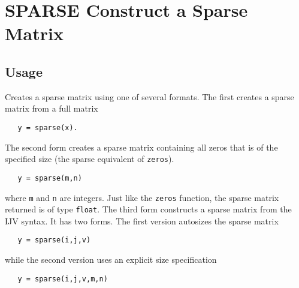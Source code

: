 \section{SPARSE Construct a Sparse Matrix}

\subsection{Usage}

Creates a sparse matrix using one of several formats.  The 
first creates a sparse matrix from a full matrix
\begin{verbatim}
   y = sparse(x).
\end{verbatim}
The second form creates a sparse matrix containing all zeros
that is of the specified size (the sparse equivalent of
\verb|zeros|).
\begin{verbatim}
   y = sparse(m,n)
\end{verbatim}
where \verb|m| and \verb|n| are integers.  Just like the \verb|zeros| function,
the sparse matrix returned is of type \verb|float|.  The third form 
constructs a sparse matrix from the IJV syntax.  It has two forms.  The
first version autosizes the sparse matrix 
\begin{verbatim}
   y = sparse(i,j,v)
\end{verbatim}
while the second version uses an explicit size specification
\begin{verbatim}
   y = sparse(i,j,v,m,n)
\end{verbatim}
